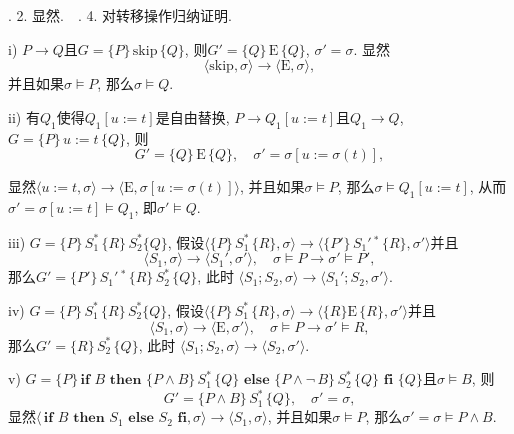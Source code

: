 \documentclass[UTF8]{ctexart}
\begin{document}

\hspace{-0.71em} {. 2.} 显然. \,\, {. 4.} 对转移操作归纳证明.

\hspace{0.5em} i) $P\to Q$且$G=\{P\}\,\mathrm{skip}\,\{Q\}$,
则$G'=\{Q\}\,\mathrm{E}\,\{Q\}$, $\sigma'=\sigma$. 显然
\[
    \langle\mathrm{skip},\sigma\rangle\to
    \langle\mathrm{E},\sigma\rangle,
\]
并且如果$\sigma\models P$, 那么$\sigma\models Q$.

\hspace{0.5em} ii) 有$Q_1$使得$Q_1[u:=t]$是自由替换,
$P\to Q_1[u:=t]$且$Q_1\to Q$, $G=\{P\}\,u:=t\,\{Q\}$, 则
\[
    G'=\{Q\}\,\mathrm{E}\,\{Q\},\quad\sigma'=\sigma[u:=\sigma(t)],
\]

显然$\langle u:=t,\sigma\rangle\to
\langle\mathrm{E},\sigma[u:=\sigma(t)]\rangle$,
并且如果$\sigma\models P$, 那么$\sigma\models Q_1[u:=t]$, 从而
$\sigma'=\sigma[u:=t]\models Q_1$, 即$\sigma'\models Q$.

\vspace{1pt}
\hspace{0.5em} iii) $G=\{P\}\,S_1^*\,\{R\}\,S_2^*\{Q\}$,
假设$\langle\{P\}\,S_1^*\,\{R\},\sigma\rangle\to
\langle\{P'\}\,S_1'\,^*\,\{R\},\sigma'\rangle$并且
\[
    \langle S_1,\sigma\rangle\to\langle S_1',\sigma'\rangle,\quad
    \sigma\models P\to\sigma'\models P',
\]
那么$G'=\{P'\}\,S_1'\,^*\,\{R\}\,S_2^*\,\{Q\}$, 此时
$\langle S_1;S_2,\sigma\rangle\to\langle S_1';S_2,\sigma'\rangle$.

\hspace{0.5em} iv) $G=\{P\}\,S_1^*\,\{R\}\,S_2^*\{Q\}$,
假设$\langle\{P\}\,S_1^*\,\{R\},\sigma\rangle\to
\langle\{R\}\mathrm{E}\,\{R\},\sigma'\rangle$并且
\[
    \langle S_1,\sigma\rangle\to\langle\mathrm{E},\sigma'\rangle,\quad
    \sigma\models P\to\sigma'\models R,
\]
那么$G'=\{R\}\,S_2^*\,\{Q\}$, 此时
$\langle S_1;S_2,\sigma\rangle\to\langle S_2,\sigma'\rangle$.

\vspace{1pt}
\hspace{0.5em} v) $G=\{P\}\,\mathbf{if}\,\,B\,\,\mathbf{then}\,\,
\{P\land B\}\,S_1^*\,\{Q\}\,\,\mathbf{else}\,\,\{P\land\neg\,B\}\,S_2^*
\,\{Q\}\,\,\mathbf{fi}\,\,\{Q\}$且$\sigma\models B$, 则
\[
    G'=\{P\land B\}\,S_1^*\,\{Q\},\quad\sigma'=\sigma,
\]
显然$\langle\,\mathbf{if}\,\,B\,\,\mathbf{then}\,\,S_1\,\,\mathbf{else}\,\,
S_2\,\,\mathbf{fi},\sigma\rangle\to\langle S_1,\sigma\rangle$,
并且如果$\sigma\models P$, 那么$\sigma'=\sigma\models P\land B$.
\end{document}

